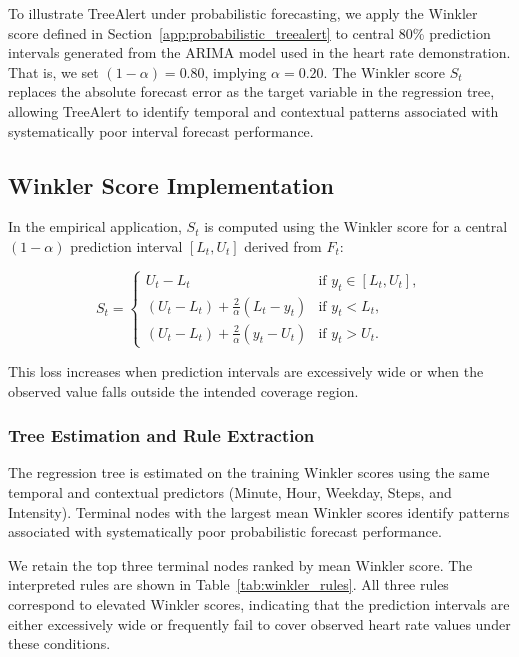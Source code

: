 \documentclass[preprint,12pt]{elsarticle}
\begin{document}
To illustrate TreeAlert under probabilistic forecasting, we apply the Winkler score defined in Section~\ref{app:probabilistic_treealert} to central 80\% prediction intervals generated from the ARIMA model used in the heart rate demonstration. That is, we set $(1-\alpha)=0.80$, implying $\alpha=0.20$. The Winkler score $S_t$ replaces the absolute forecast error as the target variable in the regression tree, allowing TreeAlert to identify temporal and contextual patterns associated with systematically poor interval forecast performance.


\subsection{Winkler Score Implementation}

In the empirical application, $S_t$ is computed using the Winkler score 
for a central $(1-\alpha)$ prediction interval $[L_t, U_t]$ derived 
from $F_t$:

\[
S_t =
\begin{cases}
U_t - L_t 
& \text{if } y_t \in [L_t, U_t], \\[3pt]
(U_t - L_t) + \frac{2}{\alpha}(L_t - y_t) 
& \text{if } y_t < L_t, \\[3pt]
(U_t - L_t) + \frac{2}{\alpha}(y_t - U_t) 
& \text{if } y_t > U_t.
\end{cases}
\]

This loss increases when prediction intervals are excessively wide or 
when the observed value falls outside the intended coverage region.



\subsubsection*{Tree Estimation and Rule Extraction}

The regression tree is estimated on the training Winkler scores using the same temporal and contextual predictors (Minute, Hour, Weekday, Steps, and Intensity). Terminal nodes with the largest mean Winkler scores identify patterns associated with systematically poor probabilistic forecast performance.

We retain the top three terminal nodes ranked by mean Winkler score. The interpreted rules are shown in Table~\ref{tab:winkler_rules}. All three rules correspond to elevated Winkler scores, indicating that the prediction intervals are either excessively wide or frequently fail to cover observed heart rate values under these conditions.
\end{document}
